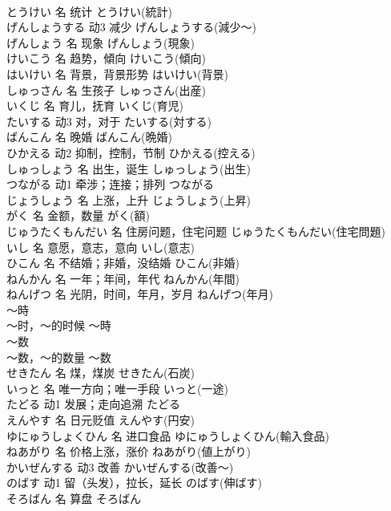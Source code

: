 \documentclass[8pt]{extreport}
\begin{document}
\begin{CJK}{UTF8}{min}
\\	とうけい	名	统计	とうけい(統計)	
\\	げんしょうする	动3	减少	げんしょうする(減少～)	
\\	げんしょう	名	现象	げんしょう(現象)	
\\	けいこう	名	趋势，傾向	けいこう(傾向)	
\\	はいけい	名	背景，背景形势	はいけい(背景)	
\\	しゅっさん	名	生孩子	しゅっさん(出産)	
\\	いくじ	名	育儿，抚育	いくじ(育児)	
\\	たいする	动3	对，对于	たいする(対する)	
\\	ばんこん	名	晚婚	ばんこん(晩婚)	
\\	ひかえる	动2	抑制，控制，节制	ひかえる(控える)	
\\	しゅっしょう	名	出生，诞生	しゅっしょう(出生)	
\\	つながる	动1	牵涉；连接；排列	つながる	
\\	じょうしょう	名	上涨，上升	じょうしょう(上昇)	
\\	がく	名	金额，数量	がく(額)	
\\	じゅうたくもんだい	名	住房问题，住宅问题	じゅうたくもんだい(住宅問題)	
\\	いし	名	意愿，意志，意向	いし(意志)	
\\	ひこん	名	不结婚；非婚，没结婚	ひこん(非婚)	
\\	ねんかん	名	一年；年间，年代	ねんかん(年間)	
\\	ねんげつ	名	光阴，时间，年月，岁月	ねんげつ(年月)	
\\	～時	
\\	～时，～的时候	～時	
\\	～数	
\\	～数，～的数量	～数	
\\	せきたん	名	煤，煤炭	せきたん(石炭)	
\\	いっと	名	唯一方向；唯一手段	いっと(一途)	
\\	たどる	动1	发展；走向追溯	たどる	
\\	えんやす	名	日元贬值	えんやす(円安)	
\\	ゆにゅうしょくひん	名	进口食品	ゆにゅうしょくひん(輸入食品)	
\\	ねあがり	名	价格上涨，涨价	ねあがり(値上がり)	
\\	かいぜんする	动3	改善	かいぜんする(改善～)	
\\	のばす	动1	留（头发），拉长，延长	のばす(伸ばす)	
\\	そろばん	名	算盘	そろばん	

\end{CJK}
\end{document}
